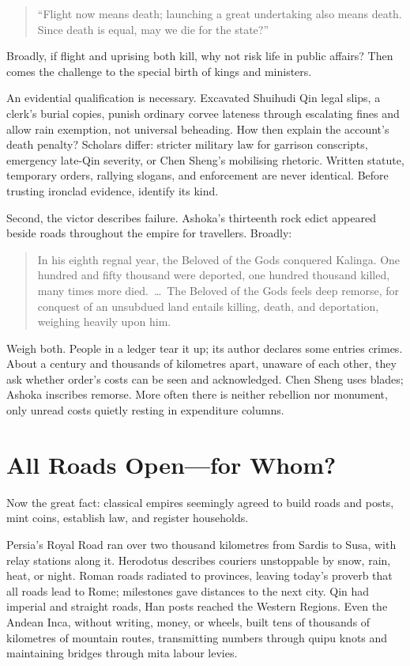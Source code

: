\begin{quote}
``Flight now means death; launching a great undertaking also means death. Since death is equal, may we die for the state?''
\end{quote}
Broadly, if flight and uprising both kill, why not risk life in public affairs? Then comes the challenge to the special birth of kings and ministers.

An evidential qualification is necessary. Excavated Shuihudi Qin legal slips, a clerk's burial copies, punish ordinary corvee lateness through escalating fines and allow rain exemption, not universal beheading. How then explain the account's death penalty? Scholars differ: stricter military law for garrison conscripts, emergency late-Qin severity, or Chen Sheng's mobilising rhetoric. Written statute, temporary orders, rallying slogans, and enforcement are never identical. Before trusting ironclad evidence, identify its kind.

Second, the victor describes failure. Ashoka's thirteenth rock edict appeared beside roads throughout the empire for travellers. Broadly:

\begin{quote}
In his eighth regnal year, the Beloved of the Gods conquered Kalinga. One hundred and fifty thousand were deported, one hundred thousand killed, many times more died. \,\ldots\, The Beloved of the Gods feels deep remorse, for conquest of an unsubdued land entails killing, death, and deportation, weighing heavily upon him.
\end{quote}
Weigh both. People in a ledger tear it up; its author declares some entries crimes. About a century and thousands of kilometres apart, unaware of each other, they ask whether order's costs can be seen and acknowledged. Chen Sheng uses blades; Ashoka inscribes remorse. More often there is neither rebellion nor monument, only unread costs quietly resting in expenditure columns.

\section{All Roads Open---for Whom?}
Now the great fact: classical empires seemingly agreed to build roads and posts, mint coins, establish law, and register households.

Persia's Royal Road ran over two thousand kilometres from Sardis to Susa, with relay stations along it. Herodotus describes couriers unstoppable by snow, rain, heat, or night. Roman roads radiated to provinces, leaving today's proverb that all roads lead to Rome; milestones gave distances to the next city. Qin had imperial and straight roads, Han posts reached the Western Regions. Even the Andean Inca, without writing, money, or wheels, built tens of thousands of kilometres of mountain routes, transmitting numbers through quipu knots and maintaining bridges through mita labour levies.

